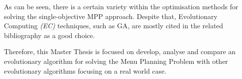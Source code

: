 As can be seen, there is a certain variety within the optimisation methods for solving the single-objective MPP approach. Despite that, Evolutionary Computing \textit{(EC)} techniques, such as GA, are mostly cited in the related bibliography as a good choice\cite{Ngo2016, Seljak2009, Moreira2018}.

Therefore, this Master Thesis is focused on develop, analyse and compare an evolutionary algorithm for solving the Menu Planning Problem with other evolutionary algorithms 
focusing on a real world case.